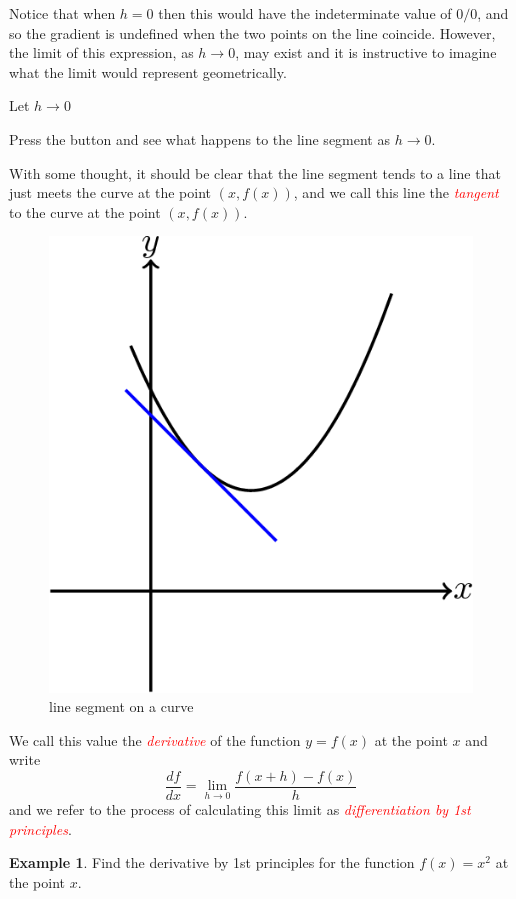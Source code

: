 \documentclass[
  11pt,
  oneside]{book}
\newcommand{\slide}{}
\theoremstyle{definition}
\theoremstyle{definition}
\newtheorem{example}{Example}[chapter]
\theoremstyle{definition}
\theoremstyle{definition}
\theoremstyle{remark}
\begin{document}
Notice that when \(h=0\) then this would have the indeterminate value of \(0/0\), and so the gradient is undefined when the two points on the line coincide. However, the limit of this expression, as \(h\to0\), may exist and it is instructive to imagine what the limit would represent geometrically.

\begin{htmlonly}

\label{div_head}
Let \(h\to 0\)

\label{div_body}

Press the button and see what happens to the line segment as \(h\to0\).

\end{htmlonly}

With some thought, it should be clear that the line segment tends to a line that just meets the curve at the point \((x,f(x))\), and we call this line the \textcolor{red}{\em tangent} to the curve at the point \((x,f(x))\).

\begin{figure}

{\centering \includegraphics[width=0.3\linewidth]{tikztopng-figure12} 

}

\caption{line segment on a curve}\label{fig:unnamed-chunk-7}
\end{figure}

\slide

We call this value the \textcolor{red}{\em derivative} of the function \(y=f(x)\) at the point \(x\) and write
\[
\frac{df}{dx} = \lim\limits_{h\to0}\frac{f(x+h)-f(x)}{h}
\]
and we refer to the process of calculating this limit as \textcolor{red}{\em differentiation by 1st principles}.

\slide

\begin{example}
Find the derivative by 1st principles for the function \(f(x) = x^2\) at the point \(x\).
\end{example}
\end{document}
